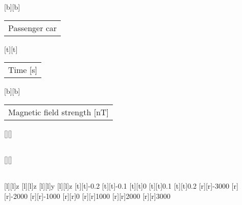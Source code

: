 %
%
[b][b]{\fontsize{8}{12}\selectfont \setlength{\tabcolsep}{0pt}\begin{tabular}{c}Passenger car\end{tabular}}%
[t][t]{\fontsize{8}{12}\selectfont \setlength{\tabcolsep}{0pt}\begin{tabular}{c}Time [s]\end{tabular}}%
[b][b]{\fontsize{8}{12}\selectfont \setlength{\tabcolsep}{0pt}\begin{tabular}{c}Magnetic field strength [nT]\end{tabular}}%
[][]{\fontsize{10}{15}\selectfont \setlength{\tabcolsep}{0pt}\begin{tabular}{c} \end{tabular}}%
[][]{\fontsize{10}{15}\selectfont \setlength{\tabcolsep}{0pt}\begin{tabular}{c} \end{tabular}}%
[l][l]{\fontsize{6}{15}\selectfont z}%
[l][l]{\fontsize{6}{15}\selectfont z}%
[l][l]{\fontsize{6}{15}\selectfont y}%
[l][l]{\fontsize{6}{15}\selectfont z}%
%
\fontsize{6}{15}%
\selectfont%
%
[t][t]{-0.2}%
[t][t]{-0.1}%
[t][t]{0}%
[t][t]{0.1}%
[t][t]{0.2}%
%
[r][r]{-3000}%
[r][r]{-2000}%
[r][r]{-1000}%
[r][r]{0}%
[r][r]{1000}%
[r][r]{2000}%
[r][r]{3000}%
%
%
